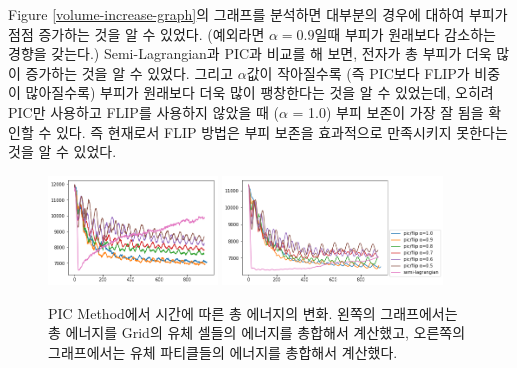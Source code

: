 \documentclass[11pt, A4]{article}
\begin{document}
Figure \ref{volume-increase-graph}의 그래프를 분석하면 대부분의 경우에 대하여 부피가 점점 증가하는 것을 알 수 있었다. (예외라면 $\alpha=0.9$일때 부피가 원래보다 감소하는 경향을 갖는다.) Semi-Lagrangian과 PIC과 비교를 해 보면, 전자가 총 부피가 더욱 많이 증가하는 것을 알 수 있었다. 그리고 $\alpha$값이 작아질수록 (즉 PIC보다 FLIP가 비중이 많아질수록) 부피가 원래보다 더욱 많이 팽창한다는 것을 알 수 있었는데, 오히려 PIC만 사용하고 FLIP를 사용하지 않았을 때 ($\alpha$ = 1.0) 부피 보존이 가장 잘 됨을 확인할 수 있다. 즉 현재로서 FLIP 방법은 부피 보존을 효과적으로 만족시키지 못한다는 것을 알 수 있었다. 

\begin{figure}[h]
  \centering
  \includegraphics[width=0.4\textwidth]{picflip-energy-graph}
  \includegraphics[width=0.52\textwidth]{picflip-particle-energy-graph}
  \caption{PIC Method에서 시간에 따른 총 에너지의 변화. 왼쪽의 그래프에서는 총 에너지를 Grid의 유체 셀들의 에너지를 총합해서 계산했고, 오른쪽의 그래프에서는 유체 파티클들의 에너지를 총합해서 계산했다.}
  \label{energy-graph}
\end{figure}
\end{document}
